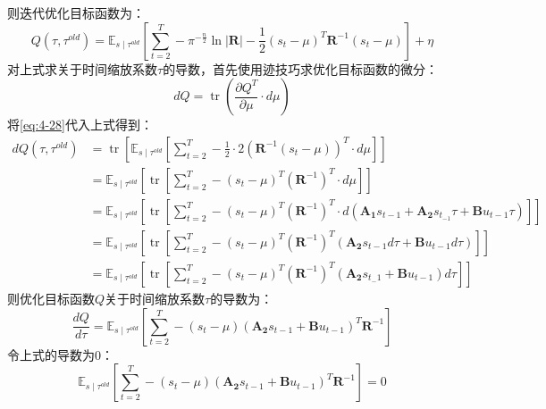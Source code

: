 则迭代优化目标函数为：
\begin{equation}
    Q\left(\tau, \tau^{old}\right)
    =\mathbb{E}_{s \mid \tau^{old}}\left[\sum_{t=2}^T-\pi^{-\frac{n}{2}}\ln\mathbf{|R|}-\frac{1}{2}\left(s_t-\mu\right)^T \mathbf{R}^{-1}\left(s_t-\mu\right)\right] + \eta
    \label{eq:4-24}
\end{equation}
对上式求关于时间缩放系数$\tau$的导数，首先使用迹技巧求优化目标函数的微分：
\begin{equation}
    d Q=\operatorname{tr}\left(\frac{\partial Q^T}{\partial \mu} \cdot d \mu\right)
    \label{eq:4-25}
\end{equation}
将\ref{eq:4-28}代入上式得到：
\begin{equation}
    \begin{aligned}
    d Q\left(\tau, \tau^{old}\right)
    & =\operatorname{tr}\left[\mathbb{E}_{s \mid \tau^{old}}\left[\sum_{t=2}^T-\frac{1}{2} \cdot 2 \left(\mathbf{R}^{-1}\left(s_t-\mu\right)\right)^T \cdot d \mu\right]\right] \\
    & =\mathbb{E}_{s \mid \tau^{old}}\left[\operatorname{tr}\left[\sum_{t=2}^T-\left(s_t-\mu\right)^T \left(\mathbf{R}^{-1}\right)^T \cdot d \mu\right]\right] \\
    & =\mathbb{E}_{s \mid \tau^{old}}\left[\operatorname{tr}\left[\sum_{t=2}^T-\left(s_t-\mu\right)^T \left(\mathbf{R}^{-1}\right)^T \cdot d\left(\mathbf{A_1} s_{t-1}+\mathbf{A_2} s_{t_{-1}} \tau+\mathbf{B} u_{t-1} \tau\right)\right]\right] \\
    & =\mathbb{E}_{s \mid \tau^{old}}\left[\operatorname{tr}\left[\sum_{t=2}^T-\left(s_t-\mu\right)^T \left(\mathbf{R}^{-1}\right)^T\left(\mathbf{A_2}s_{t-1} d \tau+\mathbf{B} u_{t-1} d \tau\right)\right]\right] \\
    & =\mathbb{E}_{s \mid \tau^{old}}\left[\operatorname{tr}\left[\sum_{t=2}^T-\left(s_t-\mu\right)^T \left(\mathbf{R}^{-1}\right)^T(\mathbf{A_2} s_{t_-1}+\mathbf{B} u_{t-1}) d \tau \right]\right]
    \end{aligned}
    \label{eq:4-26}
\end{equation}
则优化目标函数$Q$关于时间缩放系数$\tau$的导数为：
\begin{equation}
    \frac{d Q}{d \tau}=\mathbb{E}_{s \mid \tau^{old}}\left[\sum_{t=2}^T -\left(s_t-\mu\right)\left(\mathbf{A_2} s_{t-1}+\mathbf{B} u_{t-1}\right)^T\mathbf{R}^{-1}\right]
    \label{eq:4-27}
\end{equation}
令上式的导数为0：
\begin{equation}
    \mathbb{E}_{s \mid \tau^{old}}\left[\sum_{t=2}^T -\left(s_t-\mu\right)\left(\mathbf{A_2} s_{t-1}+\mathbf{B} u_{t-1}\right)^T\mathbf{R}^{-1}\right] = 0
    \label{eq:4-28}
\end{equation}
